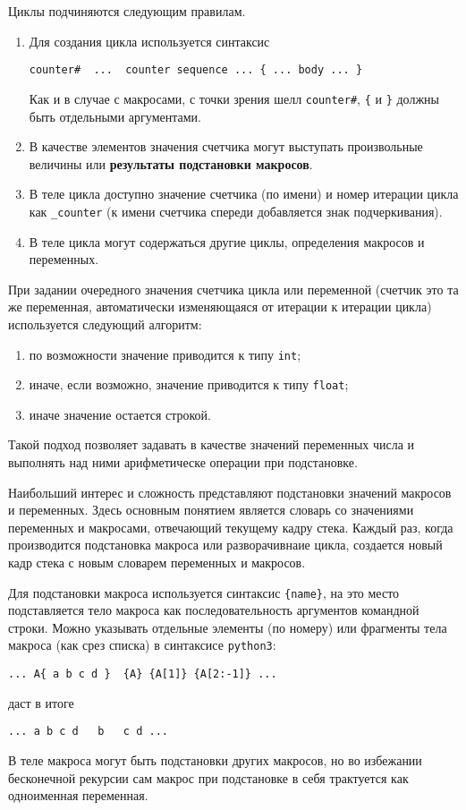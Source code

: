 \documentclass[12pt]{article}
\def\python{{\tt python3}}
\begin{document}
Циклы подчиняются следующим правилам.
\begin{enumerate}
\item Для создания цикла используется синтаксис
\begin{verbatim}
counter#  ...  counter sequence ... { ... body ... }
\end{verbatim}
Как и в случае с макросами, с точки зрения шелл \verb'counter#', \verb'{' и \verb'}' должны быть отдельными аргументами.
\item В качестве элементов значения счетчика могут выступать произвольные величины или {\bf результаты подстановки макросов}.
\item В теле цикла доступно значение счетчика (по имени) и номер итерации цикла как \verb'_counter' (к имени счетчика спереди добавляется знак подчеркивания).
\item В теле цикла могут содержаться другие циклы, определения макросов и переменных.
\end{enumerate}

При задании очередного значения счетчика цикла или переменной (счетчик это та же переменная, автоматически изменяющаяся от итерации к итерации цикла)
используется следующий алгоритм:
\begin{enumerate}
\item по возможности значение приводится к типу \verb'int';
\item иначе, если возможно, значение приводится к типу \verb'float';
\item иначе значение остается строкой.
\end{enumerate}
Такой подход позволяет задавать в качестве значений переменных числа и выполнять над ними арифметическе операции при подстановке.

Наибольший интерес и сложность представляют подстановки значений макросов и переменных. Здесь основным понятием является словарь со значениями
переменных и макросами, отвечающий текущему кадру стека. 
Каждый раз, когда производится подстановка  макроса или разворачивнаие цикла, создается новый кадр стека с новым словарем переменных и макросов.

Для подстановки макроса используется синтаксис \verb'{name}', на это место подставляется тело макроса как последовательность аргументов командной строки.
Можно указывать отдельные элементы (по номеру) или фрагменты тела макроса (как срез списка) в синтаксисе \python:
\begin{verbatim}
... A{ a b c d }  {A} {A[1]} {A[2:-1]} ...
\end{verbatim}
даст в итоге
\begin{verbatim}
... a b c d   b   c d ...
\end{verbatim}
В теле макроса могут быть подстановки других макросов, но во избежании бесконечной рекурсии сам макрос при подстановке в себя трактуется как
одноименная переменная.
\end{document}
